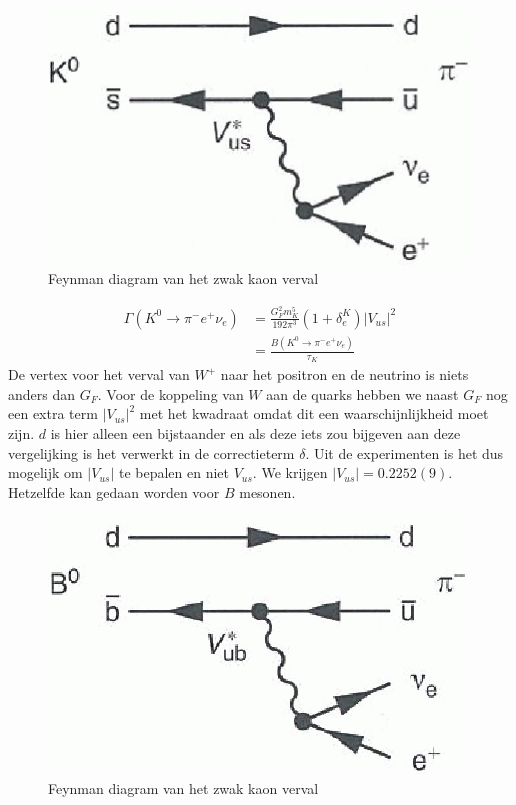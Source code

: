\documentclass[../main.tex]{subfiles}
\begin{document}
\begin{figure}[h]
    \centering
    \includegraphics[width=0.5\linewidth]{meson_mixing_and_oscillations/zwak_s_verval.png}
    \caption{Feynman diagram van het zwak kaon verval}%
    \label{fig:meson_mixing_and_oscillations/zwak_s_verval}
\end{figure}

\begin{equation}
    \begin{aligned}
        \label{eq:kaon_zwak_verval}
        \Gamma\left(K^{0} \rightarrow \pi^{-} e^{+} \nu_{e}\right) &=\frac{G_{F}^{2} m_{K}^{5}}{192 \pi^{3}}\left(1+\delta_{e}^{K}\right)\left|V_{u s}\right|^{2} \\
                                                                   &=\frac{B\left(K^{0} \rightarrow \pi^{-} e^{+} \nu_{e}\right)}{\tau_{K}}
    \end{aligned}
\end{equation}
De vertex voor het verval van $W^+$ naar het positron en de neutrino is niets anders dan $G_F$. Voor de koppeling van $W$ aan de quarks hebben we naast $G_F$ nog een extra term $|V_{us}|^2$ met het kwadraat omdat dit een waarschijnlijkheid moet zijn. $d$ is hier alleen een bijstaander en als deze iets zou bijgeven aan deze vergelijking is het verwerkt in de correctieterm $\delta$. Uit de experimenten is het dus mogelijk om $|V_{us}|$ te bepalen en niet $V_{us}$. We krijgen $\left|V_{us}\right|=0.2252(9)$.\\
Hetzelfde kan gedaan worden voor $B$ mesonen.

\begin{figure}[h]
    \centering
    \includegraphics[width=0.5\linewidth]{meson_mixing_and_oscillations/zwak_b_verval.png}
    \caption{Feynman diagram van het zwak kaon verval}%
    \label{fig:meson_mixing_and_oscillations/zwak_b_verval}
\end{figure}
\end{document}
